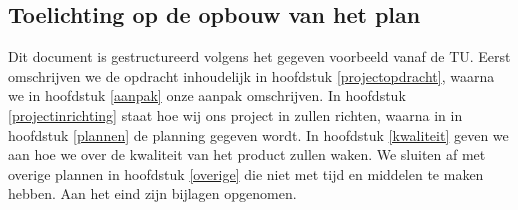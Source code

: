 \subsection{Toelichting op de opbouw van het plan}

Dit document is gestructureerd volgens het gegeven voorbeeld vanaf de TU.
Eerst omschrijven we de opdracht inhoudelijk in hoofdstuk \ref{projectopdracht}, waarna we in hoofdstuk \ref{aanpak} onze aanpak omschrijven.
In hoofdstuk \ref{projectinrichting} staat hoe wij ons project in zullen richten, waarna in in hoofdstuk \ref{plannen} de planning gegeven wordt.
In hoofdstuk \ref{kwaliteit} geven we aan hoe we over de kwaliteit van het product zullen waken.
We sluiten af met overige plannen in hoofdstuk \ref{overige} die niet met tijd en middelen te maken hebben. Aan het eind zijn bijlagen opgenomen. 
